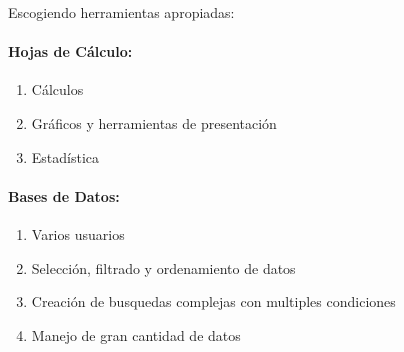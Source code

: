 Escogiendo herramientas apropiadas:
\begin{multicols}{2}
	\paragraph{Hojas de Cálculo: }
	\begin{enumerate}
		\item Cálculos
		\item Gráficos y herramientas de presentación
		\item Estadística
	\end{enumerate}
	\columnbreak
	\paragraph{Bases de Datos: }
	\begin{enumerate}
		\item Varios usuarios
		\item Selección, filtrado y ordenamiento de datos
		\item Creación de busquedas complejas con multiples condiciones
		\item Manejo de gran cantidad de datos
	\end{enumerate}
\end{multicols}

































